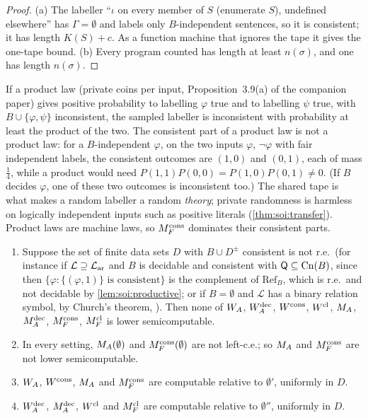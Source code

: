 \begin{proof}
(a) The labeller ``$\iota$ on every member of $S$ (enumerate $S$), undefined elsewhere'' has $\Gamma=\emptyset$ and labels only $B$-independent sentences, so it is consistent; it has length $K(S)+c$. As a function machine that ignores the tape it gives the one-tape bound. (b) Every program counted has length at least $n(\sigma)$, and one has length $n(\sigma)$.
\end{proof}

\begin{remark}\label{rem:soi:product}
If a product law (private coins per input, Proposition~3.9(a) of the companion paper) gives positive probability to labelling $\varphi$ true and to labelling $\psi$ true, with $B\cup\{\varphi,\psi\}$ inconsistent, the sampled labeller is inconsistent with probability at least the product of the two. The consistent part of a product law is not a product law: for a $B$-independent $\varphi$, on the two inputs $\varphi$, $\neg\varphi$ with fair independent labels, the consistent outcomes are $(1,0)$ and $(0,1)$, each of mass $\frac14$, while a product would need $P(1,1)P(0,0)=P(1,0)P(0,1)\ne0$. (If $B$ decides $\varphi$, one of these two outcomes is inconsistent too.) The shared tape is what makes a random labeller a random \emph{theory}; private randomness is harmless on logically independent inputs such as positive literals (\cref{thm:soi:transfer}). Product laws are machine laws, so $M_{F}^{\mathrm{cons}}$ dominates their consistent parts.
\end{remark}

\begin{proposition}\label{prop:soi:computability}
\begin{enumerate}[label=(\alph*),leftmargin=*]
\item Suppose the set of finite data sets $D$ with $B\cup D^\pm$ consistent is not r.e.\ (for instance if $\mathcal L\supseteq\mathcal{L}_{\mathrm{ar}}$ and $B$ is decidable and consistent with $\mathsf{Q}\subseteq\mathrm{Cn}(B)$, since then $\{\varphi:\{(\varphi,1)\}\text{ is consistent}\}$ is the complement of $\mathrm{Ref}_B$, which is r.e.\ and not decidable by \cref{lem:soi:productive}; or if $B=\emptyset$ and $\mathcal L$ has a binary relation symbol, by Church's theorem, \citealp{church1936note}). Then none of $W_{A}$, $W_{A}^{\mathrm{dec}}$, $W^{\mathrm{cons}}$, $W^{\mathrm{cl}}$, $M_{A}$, $M_{A}^{\mathrm{dec}}$, $M_{F}^{\mathrm{cons}}$, $M_{F}^{\mathrm{cl}}$ is lower semicomputable.
\item In every setting, $M_{A}(\emptyset)$ and $M_{F}^{\mathrm{cons}}(\emptyset)$ are not left-c.e.; so $M_{A}$ and $M_{F}^{\mathrm{cons}}$ are not lower semicomputable.
\item $W_{A}$, $W^{\mathrm{cons}}$, $M_{A}$ and $M_{F}^{\mathrm{cons}}$ are computable relative to $\emptyset'$, uniformly in $D$.
\item[(c$'$)] $W_{A}^{\mathrm{dec}}$, $M_{A}^{\mathrm{dec}}$, $W^{\mathrm{cl}}$ and $M_{F}^{\mathrm{cl}}$ are computable relative to $\emptyset''$, uniformly in $D$.
\end{enumerate}
\end{proposition}

